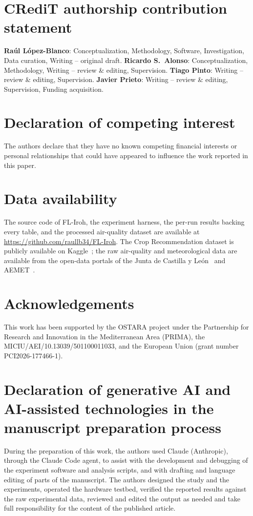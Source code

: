 \documentclass[a4paper,fleqn]{cas-dc}
\begin{document}
\section*{CRediT authorship contribution statement}
\textbf{Ra\'ul L\'opez-Blanco}: Conceptualization, Methodology, Software, Investigation, Data curation, Writing -- original draft. \textbf{Ricardo S.~Alonso}: Conceptualization, Methodology, Writing -- review \& editing, Supervision. \textbf{Tiago Pinto}: Writing -- review \& editing, Supervision. \textbf{Javier Prieto}: Writing -- review \& editing, Supervision, Funding acquisition.

\section*{Declaration of competing interest}
The authors declare that they have no known competing financial interests or personal relationships that could have appeared to influence the work reported in this paper.

\section*{Data availability}
The source code of FL-Iroh, the experiment harness, the per-run results backing every table, and the processed air-quality dataset are available at \url{https://github.com/raullb34/FL-Iroh}. The Crop Recommendation dataset is publicly available on Kaggle~\cite{cropdataset}; the raw air-quality and meteorological data are available from the open-data portals of the Junta de Castilla y Le\'on~\cite{cyl2023airquality} and AEMET~\cite{aemet2023}.

\section*{Acknowledgements}
This work has been supported by the OSTARA project under the Partnership for Research and Innovation in the Mediterranean Area (PRIMA), the MICIU/AEI/10.13039/501100011033, and the European Union (grant number PCI2026-177466-1).
\section*{Declaration of generative AI and AI-assisted technologies in the manuscript preparation process}
During the preparation of this work, the authors used Claude (Anthropic), through the Claude Code agent, to assist with the development and debugging of the experiment software and analysis scripts, and with drafting and language editing of parts of the manuscript. The authors designed the study and the experiments, operated the hardware testbed, verified the reported results against the raw experimental data, reviewed and edited the output as needed and take full responsibility for the content of the published article.
\end{document}
